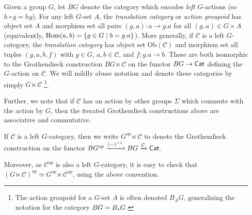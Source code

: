 \documentclass[a4paper,10pt
,draft
]{article}%
\renewcommand{\1}{\eta}%
\begin{document}

\begin{example}
      \label{G_GR_REM}
      Given a group $G$, let $BG$ denote the category which encodes \textit{left} $G$-actions (so $h \circ g = h g$).
      For any left $G$-set $A$, the \textit{translation category} or \textit{action groupoid}
      has object set $A$
      and morphism set all pairs $(g,a): a \to g.a$ for all $(g,a) \in G \times A$
      (equivalently, $\operatorname{Hom}(a,b) = \left\{ g \in G \;|\; b = g.a\right\}$).
      More generally, if $\mathcal C$ is a left $G$-category, the \textit{translation category}
      has object set $\mathrm{Ob}(\mathcal C)$
      and morphism set all tuples $(g,a,b,f)$ with $g \in G$, $a,b\in \mathcal C$, and $f: g.a \to b$.
      These are both isomorphic to the Grothendieck construction $BG \ltimes \mathcal C$
      on the functor $BG \to \mathsf{Cat}$ defining the $G$-action on $\mathcal C$.
      We will mildly abuse notation and denote these categories by simply $G \ltimes \mathcal C$
      \footnote{
        The action groupoid for a $G$-set $A$ is often denoted $B_A G$, generalizing the notation for the category $B G = B_{\**} G$.}.
      
      Further, we note that if $\mathcal C$ has an action by other groups $\Sigma$ which commute with the action by $G$,
      then the iterated Grothendieck constructions above are associative and commutative.
\end{example}

\begin{remark}
      \label{GOP_REM}
      If $\mathcal C$ is a left $G$-category, then we write
      $G^{op} \ltimes \mathcal C$ to denote the Grothendieck construction on the functor
      $BG^{op} \xrightarrow{(-)^{-1}} BG \xrightarrow{\mathcal C} \mathsf{Cat}$.

      Moreover, as $\mathcal C^{op}$ is also a left $G$-category, it is easy to check that
      $(G \ltimes \mathcal C)^{op} \simeq G^{op} \ltimes \mathcal C^{op}$,
      using the above convention.
\end{remark}





\end{document}
